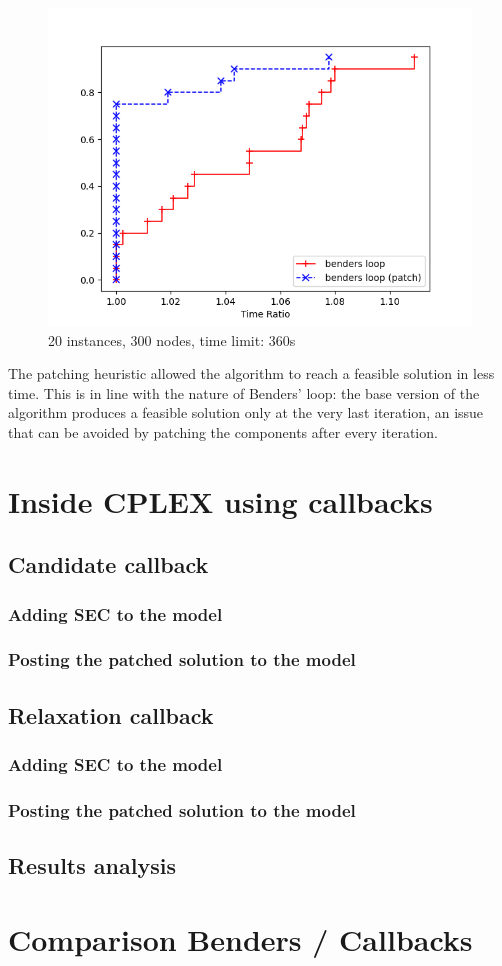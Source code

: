 \FloatBarrier
\begin{figure}[h]
    \centering
    \includegraphics*[width=.6\textwidth]{../plots/perfprof_benders_times.png}
    \caption*{20 instances, 300 nodes, time limit: 360s}
\end{figure}
\FloatBarrier

The patching heuristic allowed the algorithm to reach a feasible solution in less time. This is in line with the nature of Benders' loop: the base version of the algorithm produces a feasible solution only at the very last iteration, an issue that can be avoided by patching the components after every iteration.

\section{Inside CPLEX using callbacks}

\subsection{Candidate callback}

\subsubsection{Adding SEC to the model}

\subsubsection{Posting the patched solution to the model}

\subsection{Relaxation callback}

\subsubsection{Adding SEC to the model}

\subsubsection{Posting the patched solution to the model}

\subsection{Results analysis}

\section{Comparison Benders / Callbacks}